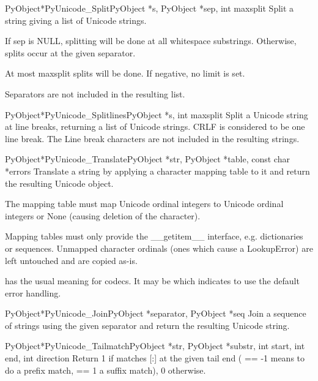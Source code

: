 \documentclass{manual}
\begin{document}
\begin{cfuncdesc}{PyObject*}{PyUnicode_Split}{PyObject *s,
                                              PyObject *sep,
                                              int maxsplit}
Split a string giving a list of Unicode strings.

If sep is NULL, splitting will be done at all whitespace
substrings. Otherwise, splits occur at the given separator.

At most maxsplit splits will be done. If negative, no limit is set.

Separators are not included in the resulting list.
\end{cfuncdesc}

\begin{cfuncdesc}{PyObject*}{PyUnicode_Splitlines}{PyObject *s,
                                                   int maxsplit}
Split a Unicode string at line breaks, returning a list of Unicode
strings.  CRLF is considered to be one line break.  The Line break
characters are not included in the resulting strings.
\end{cfuncdesc}

\begin{cfuncdesc}{PyObject*}{PyUnicode_Translate}{PyObject *str,
                                                  PyObject *table,
                                                  const char *errors}
Translate a string by applying a character mapping table to it and
return the resulting Unicode object.

The mapping table must map Unicode ordinal integers to Unicode ordinal
integers or None (causing deletion of the character).

Mapping tables must only provide the __getitem__ interface,
e.g. dictionaries or sequences. Unmapped character ordinals (ones
which cause a LookupError) are left untouched and are copied as-is.

 has the usual meaning for codecs. It may be \NULL{}
which indicates to use the default error handling.
\end{cfuncdesc}

\begin{cfuncdesc}{PyObject*}{PyUnicode_Join}{PyObject *separator,
                                             PyObject *seq}
Join a sequence of strings using the given separator and return
the resulting Unicode string.
\end{cfuncdesc}

\begin{cfuncdesc}{PyObject*}{PyUnicode_Tailmatch}{PyObject *str,
                                                  PyObject *substr,
                                                  int start,
                                                  int end,
                                                  int direction}
Return 1 if  matches [:] at
the given tail end ( == -1 means to do a prefix match,
 == 1 a suffix match), 0 otherwise.
\end{cfuncdesc}
\end{document}
